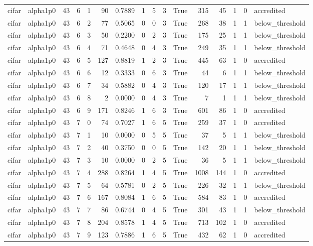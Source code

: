 \begin{tabular}{llrrrrrrrrrrrrrl}
cifar & alpha1p0 & 43 & 6 & 1 & 90 & 0.7889 & 1 & 5 & 3 & True & 315 & 45 & 1 & 0 & accredited \\
cifar & alpha1p0 & 43 & 6 & 2 & 77 & 0.5065 & 0 & 0 & 3 & True & 268 & 38 & 1 & 1 & below\_threshold \\
cifar & alpha1p0 & 43 & 6 & 3 & 50 & 0.2200 & 0 & 2 & 3 & True & 175 & 25 & 1 & 1 & below\_threshold \\
cifar & alpha1p0 & 43 & 6 & 4 & 71 & 0.4648 & 0 & 4 & 3 & True & 249 & 35 & 1 & 1 & below\_threshold \\
cifar & alpha1p0 & 43 & 6 & 5 & 127 & 0.8819 & 1 & 2 & 3 & True & 445 & 63 & 1 & 0 & accredited \\
cifar & alpha1p0 & 43 & 6 & 6 & 12 & 0.3333 & 0 & 6 & 3 & True & 44 & 6 & 1 & 1 & below\_threshold \\
cifar & alpha1p0 & 43 & 6 & 7 & 34 & 0.5882 & 0 & 4 & 3 & True & 120 & 17 & 1 & 1 & below\_threshold \\
cifar & alpha1p0 & 43 & 6 & 8 & 2 & 0.0000 & 0 & 4 & 3 & True & 7 & 1 & 1 & 1 & below\_threshold \\
cifar & alpha1p0 & 43 & 6 & 9 & 171 & 0.8246 & 1 & 6 & 3 & True & 601 & 86 & 1 & 0 & accredited \\
cifar & alpha1p0 & 43 & 7 & 0 & 74 & 0.7027 & 1 & 6 & 5 & True & 259 & 37 & 1 & 0 & accredited \\
cifar & alpha1p0 & 43 & 7 & 1 & 10 & 0.0000 & 0 & 5 & 5 & True & 37 & 5 & 1 & 1 & below\_threshold \\
cifar & alpha1p0 & 43 & 7 & 2 & 40 & 0.3750 & 0 & 0 & 5 & True & 142 & 20 & 1 & 1 & below\_threshold \\
cifar & alpha1p0 & 43 & 7 & 3 & 10 & 0.0000 & 0 & 2 & 5 & True & 36 & 5 & 1 & 1 & below\_threshold \\
cifar & alpha1p0 & 43 & 7 & 4 & 288 & 0.8264 & 1 & 4 & 5 & True & 1008 & 144 & 1 & 0 & accredited \\
cifar & alpha1p0 & 43 & 7 & 5 & 64 & 0.5781 & 0 & 2 & 5 & True & 226 & 32 & 1 & 1 & below\_threshold \\
cifar & alpha1p0 & 43 & 7 & 6 & 167 & 0.8084 & 1 & 6 & 5 & True & 584 & 83 & 1 & 0 & accredited \\
cifar & alpha1p0 & 43 & 7 & 7 & 86 & 0.6744 & 0 & 4 & 5 & True & 301 & 43 & 1 & 1 & below\_threshold \\
cifar & alpha1p0 & 43 & 7 & 8 & 204 & 0.8578 & 1 & 4 & 5 & True & 713 & 102 & 1 & 0 & accredited \\
cifar & alpha1p0 & 43 & 7 & 9 & 123 & 0.7886 & 1 & 6 & 5 & True & 432 & 62 & 1 & 0 & accredited \\

\end{tabular}
